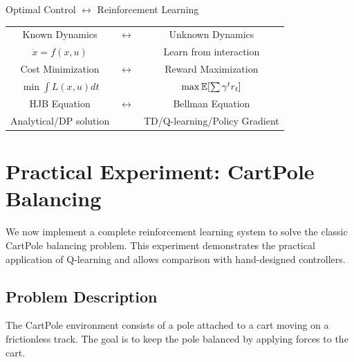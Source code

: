 \begin{conceptbox}{Optimal Control $\leftrightarrow$ Reinforcement Learning}
\begin{center}
\begin{tabular}{ccc}
Known Dynamics & $\longleftrightarrow$ & Unknown Dynamics \\
$\dot{x} = f(x,u)$ & & Learn from interaction \\[1em]
Cost Minimization & $\longleftrightarrow$ & Reward Maximization \\
$\min \int L(x,u) dt$ & & $\max \mathbb{E}[\sum \gamma^t r_t]$ \\[1em]
HJB Equation & $\longleftrightarrow$ & Bellman Equation \\
Analytical/DP solution & & TD/Q-learning/Policy Gradient
\end{tabular}
\end{center}
\end{conceptbox}

\section{Practical Experiment: CartPole Balancing}
\label{sec:experiment}

We now implement a complete reinforcement learning system to solve the classic CartPole balancing problem. This experiment demonstrates the practical application of Q-learning and allows comparison with hand-designed controllers.

\subsection{Problem Description}

The CartPole environment consists of a pole attached to a cart moving on a frictionless track. The goal is to keep the pole balanced by applying forces to the cart.

